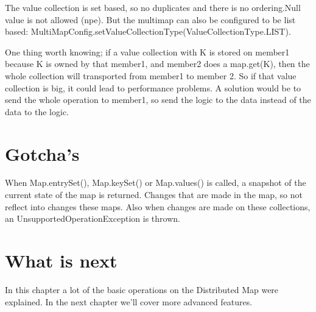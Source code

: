 The value collection is set based, so no duplicates and there is no ordering.Null value is not allowed (npe). But the multimap can also be configured to be list based: MultiMapConfig.setValueCollectionType(ValueCollectionType.LIST). 

One thing worth knowing; if a value collection with K is stored on member1 because K is owned by that member1, and member2 does a map.get(K), then the whole collection will transported from member1 to member 2. So if that value collection is big, it could lead to performance problems. A solution would be to send the whole operation to member1, so send the logic to the data instead of the data to the logic.


\section{Gotcha's}
When Map.entrySet(), Map.keySet() or Map.values() is called, a snapshot of the current state of the map is returned. Changes that are made in the map, so not reflect into changes these maps. Also when changes are made on these collections, an UnsupportedOperationException is thrown.

\section{What is next}
In this chapter a lot of the basic operations on the Distributed Map were explained. In the next chapter we'll cover more advanced features.







